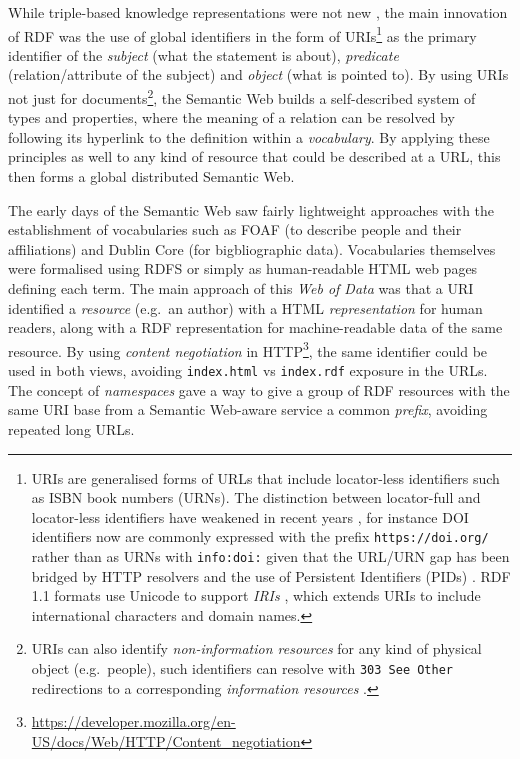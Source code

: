While triple-based knowledge representations were not new \cite{stanczykProcessModellingInformation1987}, the main innovation of RDF was the use of global identifiers in the form of URIs\footnote{URIs \cite{rfc3986} are generalised forms of URLs that include locator-less identifiers such as ISBN book numbers (URNs). The distinction between locator-full and locator-less identifiers have weakened in recent years \cite{InfoURIRegistry}, for instance DOI identifiers now are commonly expressed with the prefix \texttt{https://doi.org/} rather than as URNs with \texttt{info:doi:} given that the URL/URN gap has been bridged by HTTP resolvers and the use of Persistent Identifiers (PIDs) \cite{jutyIdentifiersOrgMIRIAM2011}. RDF 1.1 formats use Unicode to support \emph{IRIs} \cite{Duerst 2005}, which extends URIs to include international characters and domain names.} as the primary identifier of the \emph{subject} (what the statement is about), \emph{predicate} (relation/attribute of the subject) and \emph{object} (what is pointed to). By using URIs not just for documents\footnote{URIs can also identify \emph{non-information resources} for any kind of physical object (e.g.~people), such identifiers can resolve with \texttt{303\ See\ Other} redirections to a corresponding \emph{information resources} \cite{sauermannCoolURIsSemantic2011}.}, the Semantic Web builds a self-described system of types and properties, where the meaning of a relation can be resolved by following its hyperlink to the definition within a \emph{vocabulary}. By applying these principles as well to any kind of resource that could be described at a URL, this then forms a global distributed Semantic Web.

The early days of the Semantic Web saw fairly lightweight approaches with the establishment of vocabularies such as FOAF (to describe people and their affiliations) and Dublin Core (for bigbliographic data). Vocabularies themselves were formalised using RDFS or simply as human-readable HTML web pages defining each term. The main approach of this \emph{Web of Data} was that a URI identified a \emph{resource} (e.g.~an author) with a HTML \emph{representation} for human readers, along with a RDF representation for machine-readable data of the same resource. By using \emph{content negotiation} in HTTP\footnote{\url{https://developer.mozilla.org/en-US/docs/Web/HTTP/Content_negotiation}}, the same identifier could be used in both views, avoiding \texttt{index.html} vs \texttt{index.rdf} exposure in the URLs. The concept of \emph{namespaces} gave a way to give a group of RDF resources with the same URI base from a Semantic Web-aware service a common \emph{prefix}, avoiding repeated long URLs.

